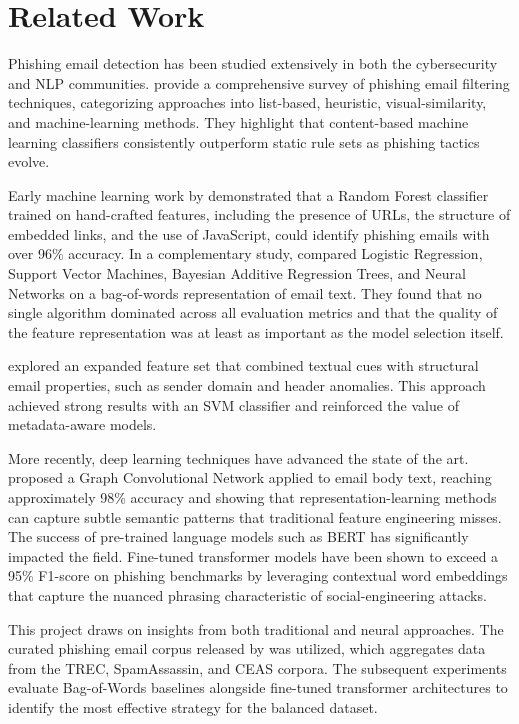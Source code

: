 \documentclass[11pt]{article}
\begin{document}
\section{Related Work}

Phishing email detection has been studied extensively in both the cybersecurity and NLP communities. \citet{Almomani2013} provide a comprehensive survey of phishing email filtering techniques, categorizing approaches into list-based, heuristic, visual-similarity, and machine-learning methods. They highlight that content-based machine learning classifiers consistently outperform static rule sets as phishing tactics evolve.

Early machine learning work by \citet{Fette2007} demonstrated that a Random Forest classifier trained on hand-crafted features, including the presence of URLs, the structure of embedded links, and the use of JavaScript, could identify phishing emails with over 96\% accuracy. In a complementary study, \citet{AbuNimeh2007} compared Logistic Regression, Support Vector Machines, Bayesian Additive Regression Trees, and Neural Networks on a bag-of-words representation of email text. They found that no single algorithm dominated across all evaluation metrics and that the quality of the feature representation was at least as important as the model selection itself.

\citet{Basnet2008} explored an expanded feature set that combined textual cues with structural email properties, such as sender domain and header anomalies. This approach achieved strong results with an SVM classifier and reinforced the value of metadata-aware models.

More recently, deep learning techniques have advanced the state of the art. \citet{Alhogail2021} proposed a Graph Convolutional Network applied to email body text, reaching approximately 98\% accuracy and showing that representation-learning methods can capture subtle semantic patterns that traditional feature engineering misses. The success of pre-trained language models such as BERT \citep{Devlin2019} has significantly impacted the field. Fine-tuned transformer models have been shown to exceed a 95\% F1-score on phishing benchmarks by leveraging contextual word embeddings that capture the nuanced phrasing characteristic of social-engineering attacks.


This project draws on insights from both traditional and neural approaches. The curated phishing email corpus released by \citet{Champa2024} was utilized, which aggregates data from the TREC, SpamAssassin, and CEAS corpora. The subsequent experiments evaluate Bag-of-Words baselines alongside fine-tuned transformer architectures to identify the most effective strategy for the balanced dataset.
\end{document}

